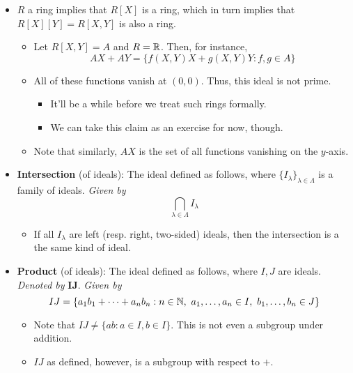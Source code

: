 \documentclass[../notes.tex]{subfiles}
\begin{document}
\begin{itemize}
\begin{itemize}
    \end{itemize}
    \item $R$ a ring implies that $R[X]$ is a ring, which in turn implies that $R[X][Y]=R[X,Y]$ is also a ring.
    \begin{itemize}
        \item Let $R[X,Y]=A$ and $R=\mathbb{R}$. Then, for instance,
        \begin{equation*}
            AX+AY = \{f(X,Y)X+g(X,Y)Y:f,g\in A\}
        \end{equation*}
        \item All of these functions vanish at $(0,0)$. Thus, this ideal is not prime.
        \begin{itemize}
            \item It'll be a while before we treat such rings formally.
            \item We can take this claim as an exercise for now, though.%
        \end{itemize}
        \item Note that similarly, $AX$ is the set of all functions vanishing on the $y$-axis.
    \end{itemize}
    \item \textbf{Intersection} (of ideals): The ideal defined as follows, where $\{I_\lambda\}_{\lambda\in\Lambda}$ is a family of ideals. \emph{Given by}
    \begin{equation*}
        \bigcap_{\lambda\in\Lambda}I_\lambda
    \end{equation*}
    \begin{itemize}
        \item If all $I_\lambda$ are left (resp. right, two-sided) ideals, then the intersection is a the same kind of ideal.
    \end{itemize}
    \item \textbf{Product} (of ideals): The ideal defined as follows, where $I,J$ are ideals. \emph{Denoted by} $\bm{IJ}$. \emph{Given by}
    \begin{equation*}
        IJ = \{a_1b_1+\cdots+a_nb_n:n\in\mathbb{N},\ a_1,\dots,a_n\in I,\ b_1,\dots,b_n\in J\}
    \end{equation*}
    \begin{itemize}
        \item Note that $IJ\neq\{ab:a\in I,b\in I\}$. This is not even a subgroup under addition.
        \item $IJ$ as defined, however, is a subgroup with respect to $+$.

\end{itemize}
\end{itemize}
\end{document}
